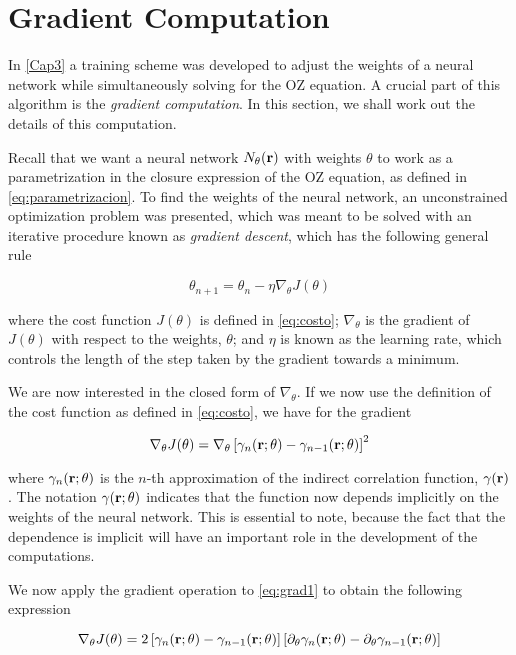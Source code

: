 \chapter{Gradient Computation}
\label{AppendixA}

In \autoref{Cap3} a training scheme was developed to adjust the weights of a neural
network while simultaneously solving for the OZ equation. A crucial part of
this algorithm is the \emph{gradient computation}. In this section, we shall work
out the details of this computation.

Recall that we want a neural network $N_{\theta}(\mathbf{r})$ with weights $\theta$ to work as a
parametrization in the closure expression of the OZ equation, as defined in
\autoref{eq:parametrizacion}. To find the weights of the neural network, an
unconstrained optimization problem was presented, which was meant to be solved with
an iterative procedure known as \emph{gradient descent}, which has the following
general rule

\[
\theta_{n+1} = \theta_{n} - \eta \nabla_{\theta} J(\theta)
\]

where the cost function $J(\theta)$ is defined in \autoref{eq:costo}; $\nabla_{\theta}$
is the gradient of $J(\theta)$ with respect to the weights, $\theta$; and $\eta$ is known
as the learning rate, which controls the length of the step taken by the gradient
towards a minimum.

We are now interested in the closed form of $\nabla_{\theta}$. If we now use the
definition of the cost function as defined in \autoref{eq:costo}, we have for the
gradient

\begin{equation}
    \nabla_{\theta} J(\theta) = \nabla_{\theta} \left[\gamma_{n}(\mathbf{r}; \theta) - \gamma_{n-1}(\mathbf{r}; \theta) \right]^2
    \label{eq:grad1}
\end{equation}

where $\gamma_{n}(\mathbf{r}; \theta)$ is the $n$-th approximation of the indirect
correlation function, $\gamma(\mathbf{r})$.
The notation $\gamma(\mathbf{r}; \theta)$ indicates that the function now depends implicitly
on the weights of the neural network. This is essential to note, because the fact that 
the dependence is implicit will have an important role in the development of the
computations.

We now apply the gradient operation to \autoref{eq:grad1} to obtain the following
expression

\begin{equation}
    \nabla_{\theta} J(\theta) = 2 \left[\gamma_{n}(\mathbf{r}; \theta) - \gamma_{n-1}(\mathbf{r}; \theta) \right]
    \left[ \partial_{\theta} \gamma_{n}(\mathbf{r}; \theta) - \partial_{\theta} \gamma_{n-1}(\mathbf{r}; \theta) \right]
    \label{eq:grad2}
\end{equation}

